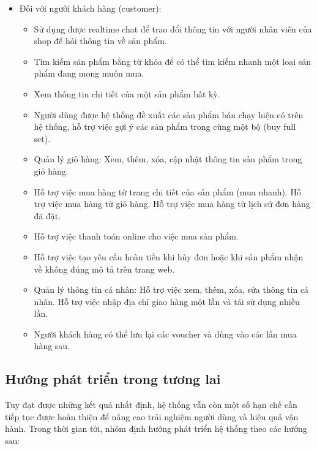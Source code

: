 \begin{itemize}
	\item Đối với người khách hàng (customer):
	      \begin{itemize}
		      \item Sử dụng được realtime chat để trao đổi thông tin với người nhân viên của shop để hỏi thông tin về sản phẩm.
		      \item Tìm kiếm sản phẩm bằng từ khóa để có thể tìm kiếm nhanh một loại sản phẩm đang mong muốn mua.
		      \item Xem thông tin chi tiết của một sản phẩm bất kỳ.
		      \item Người dùng được hệ thống đề xuất các sản phẩm bán chạy hiện có trên hệ thống, hỗ trợ việc gợi ý các sản phẩm trong cùng một bộ (buy full set).
		      \item Quản lý giỏ hàng: Xem, thêm, xóa, cập nhật thông tin sản phẩm trong giỏ hàng.
		      \item Hỗ trợ việc mua hàng từ trang chi tiết của sản phẩm (mua nhanh). Hỗ trợ việc mua hàng từ giỏ hàng. Hỗ trợ việc mua hàng từ lịch sử đơn hàng đã đặt.
		      \item Hỗ trợ việc thanh toán online cho việc mua sản phẩm.
		      \item Hỗ trợ việc tạo yêu cầu hoàn tiền khi hủy đơn hoặc khi sản phẩm nhận về không đúng mô tả trên trang web.
		      \item Quản lý thông tin cá nhân: Hỗ trợ việc xem, thêm, xóa, sửa thông tin cá nhân. Hỗ trợ việc nhập địa chỉ giao hàng một lần và tái sử dụng nhiều lần.
		      \item Người khách hàng có thể lưu lại các voucher và dùng vào các lần mua hàng sau.
	      \end{itemize}
\end{itemize}

\newpage
\subsection{Hướng phát triển trong tương lai}

Tuy đạt được những kết quả nhất định, hệ thống vẫn còn một số hạn chế cần tiếp tục được hoàn thiện để nâng cao trải nghiệm người dùng và hiệu quả vận hành. Trong thời gian tới, nhóm định hướng phát triển hệ thống theo các hướng sau:

